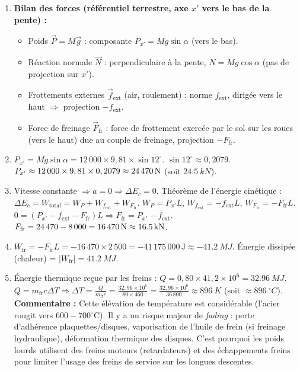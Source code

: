 \documentclass[11pt]{article}
\begin{document}
\begin{corrige}
\begin{enumerate}
    \item \textbf{Bilan des forces (référentiel terrestre, axe $x'$ vers le bas de la pente) :}
    \begin{itemize}
        \item Poids $\vec{P} = M\vec{g}$ : composante $P_{x'} = Mg\sin\alpha$ (vers le bas).
        \item Réaction normale $\vec{N}$ : perpendiculaire à la pente, $N = Mg\cos\alpha$ (pas de projection sur $x'$).
        \item Frottements externes $\vec{f}_{\text{ext}}$ (air, roulement) : norme $f_{\text{ext}}$, dirigée vers le haut $\Rightarrow$ projection $-f_{\text{ext}}$.
        \item Force de freinage $\vec{F}_{\text{fr}}$ : force de frottement exercée par le sol sur les roues (vers le haut) due au couple de freinage, projection $-F_{\text{fr}}$.
    \end{itemize}
    \item $P_{x'} = Mg\sin\alpha = 12\,000 \times 9,81 \times \sin 12^\circ$.
    $\sin 12^\circ \approx 0,2079$.
    $P_{x'} \approx 12\,000 \times 9,81 \times 0,2079 \approx \SI{24\,470}{N}$ (soit $\SI{24,5}{kN}$).
    \item Vitesse constante $\Rightarrow a=0 \Rightarrow \Delta E_c = 0$.
    Théorème de l'énergie cinétique : $\Delta E_c = W_{\text{total}} = W_P + W_{f_{\text{ext}}} + W_{F_{\text{fr}}}$.
    $W_P = P_{x'} L$, $W_{f_{\text{ext}}} = -f_{\text{ext}} L$, $W_{F_{\text{fr}}} = -F_{\text{fr}} L$.
    $0 = (P_{x'} - f_{\text{ext}} - F_{\text{fr}}) L \Rightarrow F_{\text{fr}} = P_{x'} - f_{\text{ext}}$.
    $F_{\text{fr}} = 24\,470 - 8\,000 = \SI{16\,470}{N} \approx \SI{16,5}{kN}$.
    \item $W_{\text{fr}} = -F_{\text{fr}} L = -16\,470 \times 2\,500 = -41\,175\,000\,\text{J} \approx -\SI{41,2}{MJ}$.
    Énergie dissipée (chaleur) = $|W_{\text{fr}}| = \SI{41,2}{MJ}$.
    \item Énergie thermique reçue par les freins : $Q = 0,80 \times 41,2 \times 10^6 = \SI{32,96}{MJ}$.
    $Q = m_{\text{fr}} c \Delta T \Rightarrow \Delta T = \frac{Q}{m_{\text{fr}} c} = \frac{32,96 \times 10^6}{80 \times 460} = \frac{32,96 \times 10^6}{36\,800} \approx \SI{896}{K}$ (soit $\approx \SI{896}{^\circ C}$).
    \textbf{Commentaire :} Cette élévation de température est considérable (l'acier rougit vers $600-700^\circ\text{C}$). Il y a un risque majeur de \emph{fading} : perte d'adhérence plaquettes/disques, vaporisation de l'huile de frein (si freinage hydraulique), déformation thermique des disques. C'est pourquoi les poids lourds utilisent des freins moteurs (retardateurs) et des échappements freins pour limiter l'usage des freins de service sur les longues descentes.
\end{enumerate}
\end{corrige}
\end{document}
